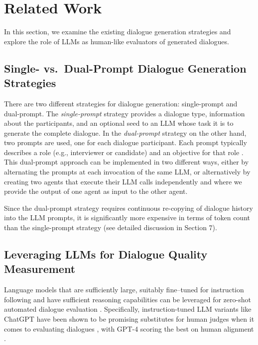 \section{Related Work}
In this section, we examine the existing dialogue generation strategies and explore the role of LLMs as human-like evaluators of generated dialogues.

\subsection{Single- vs.\ Dual-Prompt Dialogue Generation Strategies}
There are two different strategies for dialogue generation: single-prompt and dual-prompt. The \textit{single-prompt} strategy provides a dialogue type, information about the participants, and an optional seed \cite{kim23, suresh25} to an LLM whose task it is to generate the complete dialogue. In the \textit{dual-prompt} strategy on the other hand, two prompts are used, one for each dialogue participant. Each prompt typically describes a role (e.g., interviewer or candidate) and an objective for that role \cite{duan24}. This dual-prompt approach can be implemented in two different ways, either by alternating the prompts at each invocation of the same LLM, or alternatively by creating two agents \cite{fu24} that execute their LLM calls independently and where we provide the output of one agent as input to the other agent.

Since the dual-prompt strategy requires continuous re-copying of dialogue history into the LLM prompts, it is significantly more expensive in terms of token count than the single-prompt strategy (see detailed discussion in Section 7). 

\subsection{Leveraging LLMs for Dialogue Quality Measurement}
Language models that are sufficiently large, suitably fine–tuned for instruction following and have sufficient reasoning capabilities can be leveraged for zero-shot automated dialogue evaluation \cite{jia24}. Specifically, instruction-tuned LLM variants like ChatGPT have been shown to be promising substitutes for human judges when it comes to evaluating dialogues \cite{zhang24}, with GPT-4 scoring the best on human alignment \cite{duan24}.